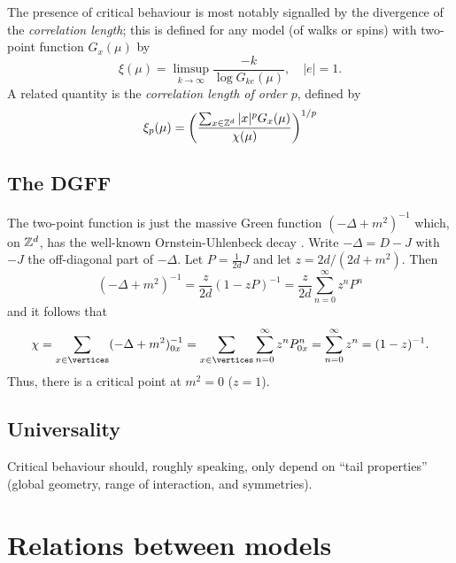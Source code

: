 The presence of critical behaviour is most notably signalled by the divergence of the
\emph{correlation length}; this is defined for any model (of walks or spins) with two-point
function $G_x(\mu)$ by
\begin{equation}
\xi(\mu) = \limsup_{k\to\infty} \frac{-k}{\log G_{ke}(\mu)}, \quad |e| = 1.
\end{equation}
A related quantity is the \emph{correlation length of order $p$}, defined by
\begin{equation}
\xi_p(\mu) = \left(\frac{\sum_{x\in{ {{\mathbb Z}}^d }} |x|^p G_x(\mu)}{\chi(\mu)}\right)^{1/p}
\end{equation}


\subsection{The DGFF}

The two-point function is just the massive Green function $(-\Delta + m^2)^{-1}$
which, on ${ {{\mathbb Z}}^d }$, has the well-known Ornstein-Uhlenbeck decay . Write $-\Delta = D - J$ with $-J$ the off-diagonal part of
$-\Delta$. Let $P = \frac{1}{2 d} J$ and let $z = 2 d / (2 d + m^2)$. Then
\begin{equation}
(-\Delta + m^2)^{-1}
  =
\frac{z}{2 d} (1 - z P)^{-1}
  =
\frac{z}{2 d} \sum_{n=0}^\infty z^n P^n
\end{equation}
and it follows that
\begin{equation}
\chi
  =
\sum_{x\in\vertices} (-\Delta + m^2)^{-1}_{0x}
  =
\sum_{x\in\vertices} \sum_{n=0}^\infty z^n P^n_{0x}
  =
\sum_{n=0}^\infty z^n
  =
(1 - z)^{-1}.
\end{equation}
Thus, there is a critical point at $m^2 = 0$ ($z = 1$).



\subsection{Universality}

Critical behaviour should, roughly speaking, only depend on ``tail properties''
(global geometry, range of interaction, and symmetries).


\section{Relations between models}


